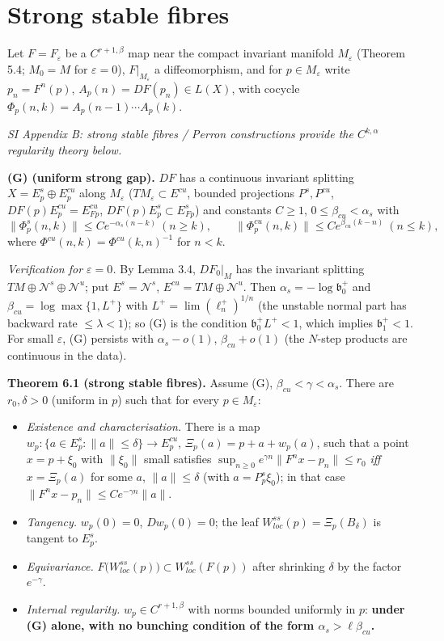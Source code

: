 \documentclass[11pt,a4paper]{article}
\theoremstyle{plain}
\theoremstyle{definition}
\theoremstyle{remark}
\numberwithin{equation}{section}
\numberwithin{figure}{section}
\begin{document}
\section{Strong stable fibres}

Let $F=F_\varepsilon$ be a $C^{r+1,\beta}$ map near the compact invariant manifold $M_\varepsilon$ (Theorem 5.4; $M_0=M$ for $\varepsilon=0$), $F|_{M_\varepsilon}$ a diffeomorphism, and for $p\in M_\varepsilon$ write $p_n=F^n(p)$, $A_p(n)=DF(p_n)\in L(X)$, with cocycle $\Phi_p(n,k)=A_p(n-1)\cdots A_p(k)$.

\textit{SI Appendix B: strong stable fibres / Perron constructions provide the $C^{k,\alpha}$ regularity theory below.}

\textbf{(G) (uniform strong gap).} $DF$ has a continuous invariant splitting $X=E^s_p\oplus E^{cu}_p$ along $M_\varepsilon$ ($TM_\varepsilon\subset E^{cu}$, bounded projections $P^s,P^{cu}$, $DF(p)E^{cu}_p=E^{cu}_{Fp}$, $DF(p)E^s_p\subset E^s_{Fp}$) and constants $C\ge1$, $0\le\beta_{cu}<\alpha_s$ with
\[
\|\Phi^s_p(n,k)\|\le Ce^{-\alpha_s(n-k)}\ (n\ge k),\qquad\|\Phi^{cu}_p(n,k)\|\le Ce^{\beta_{cu}(k-n)}\ (n\le k),
\]
where $\Phi^{cu}(n,k)=\Phi^{cu}(k,n)^{-1}$ for $n<k$.

\textit{Verification for $\varepsilon=0$.} By Lemma 3.4, $DF_0|_M$ has the invariant splitting $TM\oplus\mathcal N^s\oplus\mathcal N^u$; put $E^s=\mathcal N^s$, $E^{cu}=TM\oplus\mathcal N^u$. Then $\alpha_s=-\log\mathfrak b_0^+$ and $\beta_{cu}=\log\max\{1,L^+\}$ with $L^+=\lim(\ell_n^+)^{1/n}$ (the unstable normal part has backward rate $\le\lambda<1$); so (G) is the condition $\mathfrak b_0^+L^+<1$, which implies $\mathfrak b_1^+<1$. For small $\varepsilon$, (G) persists with $\alpha_s-o(1)$, $\beta_{cu}+o(1)$ (the $N$-step products are continuous in the data).

\textbf{Theorem 6.1 (strong stable fibres).} Assume (G), $\beta_{cu}<\gamma<\alpha_s$. There are $r_0,\delta>0$ (uniform in $p$) such that for every $p\in M_\varepsilon$:
\begin{itemize}
    \item[(a)] \textit{Existence and characterisation.} There is a map $w_p:\{a\in E^s_p:\|a\|\le\delta\}\to E^{cu}_p$, $\Xi_p(a)=p+a+w_p(a)$, such that a point $x=p+\xi_0$ with $\|\xi_0\|$ small satisfies $\sup_{n\ge0}e^{\gamma n}\|F^nx-p_n\|\le r_0$ \textit{iff} $x=\Xi_p(a)$ for some $a$, $\|a\|\le\delta$ (with $a=P^s_p\xi_0$); in that case $\|F^nx-p_n\|\le Ce^{-\gamma n}\|a\|$.
    \item[(b)] \textit{Tangency.} $w_p(0)=0$, $Dw_p(0)=0$; the leaf $W^{ss}_{loc}(p)=\Xi_p(B_\delta)$ is tangent to $E^s_p$.
    \item[(c)] \textit{Equivariance.} $F\big(W^{ss}_{loc}(p)\big)\subset W^{ss}_{loc}(F(p))$ after shrinking $\delta$ by the factor $e^{-\gamma}$.
    \item[(d)] \textit{Internal regularity.} $w_p\in C^{r+1,\beta}$ with norms bounded uniformly in $p$: \textbf{under (G) alone, with no bunching condition of the form $\alpha_s>\ell\beta_{cu}$.}
\end{itemize}
\end{document}
